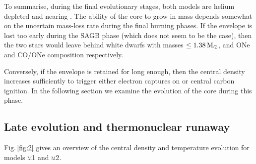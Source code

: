 \documentclass[../../main/thesis_msc.tex]{subfiles}
\begin{document}
To summarise, during the final evolutionary stages, both models are helium 
depleted and nearing \mch. The ability of the core 
to grow in mass depends somewhat on the uncertain mass-loss rate during the final burning phases. If the envelope 
is lost too early during the SAGB phase (which does not seem to be the case), then the two stars would 
leave behind white dwarfs with masses $\le 1.38\mathrm{\,M_\odot}$, and ONe and CO/ONe composition respectively. 

Conversely, if the envelope is retained for long enough, then the central density increases sufficiently to trigger either electron captures on  or central carbon ignition. 
In the following section we examine the evolution of the core during this phase. 




\subsection{Late evolution and thermonuclear runaway}\label{sec:runway}
Fig.\,\ref{fig:2} gives an overview of the central density and temperature evolution for models  \textsc{m1} and \textsc{m2}. %
\end{document}
